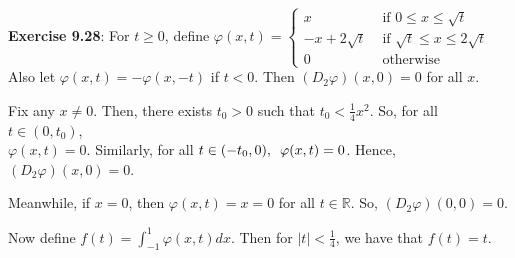 \documentclass{book}
\newcommand{\exTwo}{%
   \color{RedViolet}%
   \fontsize{13}{15}\selectfont%
}
\newenvironment{myIndent}{%
   \begin{adjustwidth}{2.5em}{0em}%
}{%
   \end{adjustwidth}%
}
\newcommand{\myHS}{ \hspace{0.5em}}
\newcommand{\mySepTwo}[1][.]{%
   {\noindent\color{#1}{\rule{6.5in}{0.5mm}}}\\%
}
\newcommand{\retTwo}{\hfill\bigbreak}
\begin{document}
\newpage

\mySepTwo

\textbf{Exercise 9.28}: For $t \geq 0$, define $\varphi(x,t) = \left\{
\begin{matrix}
   x &  \text{ if } 0 \leq x \leq \sqrt{t} \\
   -x + 2\sqrt{t} &  \text{ if } \sqrt{t} \leq x \leq 2\sqrt{t} \\
   0 &  \text{ otherwise }
\end{matrix}\right.$\\ [2pt] Also let $\varphi(x,t) = -\varphi(x, -t)$ if $t < 0$. Then $(D_2\varphi)(x, 0) = 0$ for all $x$.\\ [-6pt]

{\begin{myIndent}\exTwo
   Fix any $x \neq 0$. Then, there exists $t_0 > 0$ such that $t_0 < \frac{1}{4}x^2$. So, for all $t \in (0, t_0)$,\\ $\varphi(x, t) = 0$. Similarly, for all $t \in (-t_0, 0), \myHS \varphi(x, t) = 0$. Hence, $(D_2\varphi)(x, 0) = 0$.\retTwo

   Meanwhile, if $x = 0$, then $\varphi(x, t) = x = 0$ for all $t \in \mathbb{R}$. So, $(D_2\varphi)(0, 0) = 0$.\retTwo
\end{myIndent}}

Now define $f(t) = \int_{-1}^1 \varphi(x, t)dx$. Then for $|t| < \frac{1}{4}$, we have that $f(t) = t$.
\end{document}
